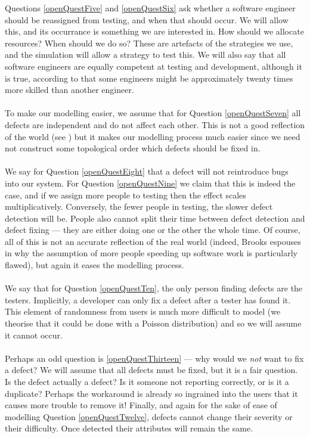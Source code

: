 Questions \ref{openQuestFive} and \ref{openQuestSix} ask whether a software engineer should be reassigned from testing, and
when that should occur.
We will allow this, and its occurrance is something we are interested in.
How should we allocate resources?
When should we do so?
These are artefacts of the strategies we use, and the simulation will allow a strategy to test
this.
We will also say that all software engineers are equally competent at testing and development,
although it is true, according to \FIXME that some engineers might be approximately twenty times
more skilled than another engineer.\\
\\
To make our modelling easier, we assume that for Question \ref{openQuestSeven} all defects are
independent and do not affect each other.
This is not a good reflection of the world (see \FIXME) but it makes our modelling process much
easier since we need not construct some topological order which defects should be fixed in.\\
\\
We say for Question \ref{openQuestEight} that a defect will not reintroduce bugs into our system.
For Question \ref{openQuestNine} we claim that this is indeed the case, and if we assign more people
to testing then the effect scales multiplicatively.
Conversely, the fewer people in testing, the slower defect detection will be.
People also cannot split their time between defect detection and defect fixing --- they are either
doing one or the other the whole time.
Of course, all of this is not an accurate reflection of the real world (indeed, Brooks espouses in
\FIXME why the assumption of more people speeding up software work is particularly flawed), but again
it eases the modelling process.\\
\\
We say that for Question \ref{openQuestTen}, the only person finding defects are the
testers.
Implicitly, a developer can only fix a defect after a tester has found it.
This element of randomness from users is much more difficult to model (we theorise that it could be
done with a Poisson distribution) and so we will assume it cannot occur.\\
\\
Perhaps an odd question is \ref{openQuestThirteen} --- why would we {\em not}
want to fix a defect?
We will assume that all defects must be fixed, but it is a fair question.
Is the defect actually a defect?
Is it someone not reporting correctly, or is it a duplicate?
Perhaps the workaround is already so ingrained into the users that it causes
more trouble to remove it!
Finally, and again for the sake of ease of modelling Question \ref{openQuestTwelve}, defects cannot
change their severity or their difficulty.
Once detected their attributes will remain the same.

